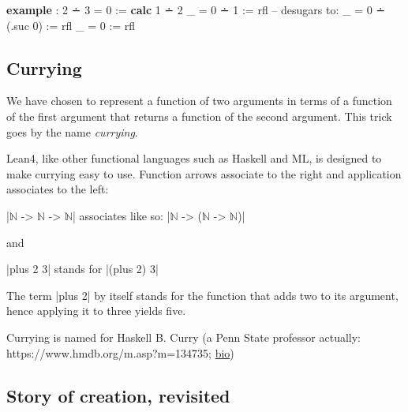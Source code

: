 \documentclass{memoir}
\newcommand{\PLFANat}{\ensuremath{\mathbb{N}}}
\newcommand{\PLFASymbol}[1]{{\PLFASymbolFont #1}}
\newcommand{\PLFAComment}[1]{\textcolor{codecomment}{#1}}
\begin{document}
\par
\begin{LeanVerbatim}
\textbf{example} : 2 \PLFASymbol{∸} 3 = 0 :=
    \textbf{calc}
        1 \PLFASymbol{∸} 2
    _ = 0 \PLFASymbol{∸} 1        := rfl \PLFAComment{-- desugars to:}
    _ = 0 \PLFASymbol{∸} (.suc 0) := rfl
    _ = 0            := rfl
\end{LeanVerbatim}

\par

\subsection{Currying}\label{PLFA--in--Lean----Part--1----Naturals----Currying}

\par
We have chosen to represent a function of two arguments in terms of a function
of the first argument that returns a function of the second argument. This trick
goes by the name \emph{currying}.

\par
Lean4, like other functional languages such as Haskell and ML, is designed to
make currying easy to use. Function arrows associate to the right and application
associates to the left:

\par
\LeanVerb|\PLFANat{} -> \PLFANat{} -> \PLFANat{}| associates like so: \LeanVerb|\PLFANat{} -> (\PLFANat{} -> \PLFANat{})|

\par
\par\noindent and

\par
\LeanVerb|plus 2 3| stands for \LeanVerb|(plus 2) 3|

\par
\par\noindent The term \LeanVerb|plus 2| by itself stands for the function that adds two to its
argument, hence applying it to three yields five.

\par
Currying is named for Haskell B. Curry (a Penn State professor actually:
https://www.hmdb.org/m.asp?m=134735;
\href{https://mathshistory.st-andrews.ac.uk/Biographies/Curry/}{bio})

\par

\subsection{Story of creation, revisited}\label{PLFA--in--Lean----Part--1----Naturals----Story--of--creation-005F-005F-005F--revisited}
\end{document}
